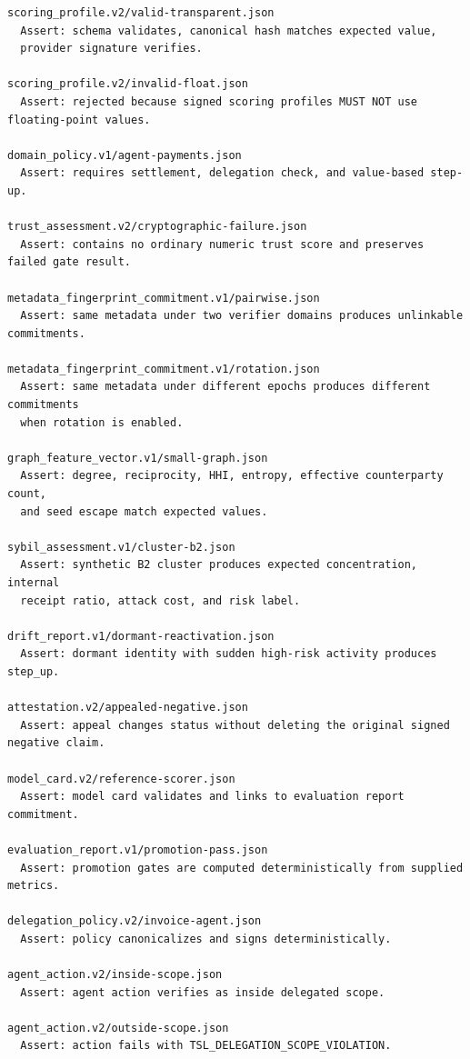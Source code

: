\documentclass[11pt]{article}
\begin{document}
\begin{lstlisting}[style=tslcode]
scoring_profile.v2/valid-transparent.json
  Assert: schema validates, canonical hash matches expected value,
  provider signature verifies.

scoring_profile.v2/invalid-float.json
  Assert: rejected because signed scoring profiles MUST NOT use floating-point values.

domain_policy.v1/agent-payments.json
  Assert: requires settlement, delegation check, and value-based step-up.

trust_assessment.v2/cryptographic-failure.json
  Assert: contains no ordinary numeric trust score and preserves failed gate result.

metadata_fingerprint_commitment.v1/pairwise.json
  Assert: same metadata under two verifier domains produces unlinkable commitments.

metadata_fingerprint_commitment.v1/rotation.json
  Assert: same metadata under different epochs produces different commitments
  when rotation is enabled.

graph_feature_vector.v1/small-graph.json
  Assert: degree, reciprocity, HHI, entropy, effective counterparty count,
  and seed escape match expected values.

sybil_assessment.v1/cluster-b2.json
  Assert: synthetic B2 cluster produces expected concentration, internal
  receipt ratio, attack cost, and risk label.

drift_report.v1/dormant-reactivation.json
  Assert: dormant identity with sudden high-risk activity produces step_up.

attestation.v2/appealed-negative.json
  Assert: appeal changes status without deleting the original signed negative claim.

model_card.v2/reference-scorer.json
  Assert: model card validates and links to evaluation report commitment.

evaluation_report.v1/promotion-pass.json
  Assert: promotion gates are computed deterministically from supplied metrics.

delegation_policy.v2/invoice-agent.json
  Assert: policy canonicalizes and signs deterministically.

agent_action.v2/inside-scope.json
  Assert: agent action verifies as inside delegated scope.

agent_action.v2/outside-scope.json
  Assert: action fails with TSL_DELEGATION_SCOPE_VIOLATION.
\end{lstlisting}
\end{document}
